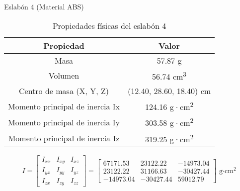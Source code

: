 {Eslabón 4 (Material ABS)}


\begin{table}[H]
	\centering
	\caption{Propiedades físicas del eslabón 4}
	\begin{tabular}{|c|c|}
		\hline
		\textbf{Propiedad} & \textbf{Valor} \\
		\hline
		Masa & 57.87 g \\
		Volumen & 56.74 cm\textsuperscript{3} \\
		Centro de masa (X, Y, Z) & (12.40, 28.60, 18.40) cm \\
		Momento principal de inercia Ix & 124.16 g·cm\textsuperscript{2} \\
		Momento principal de inercia Iy & 303.58 g·cm\textsuperscript{2} \\
		Momento principal de inercia Iz & 319.25 g·cm\textsuperscript{2} \\
		\hline
	\end{tabular}
\end{table}


\begin{equation*}
	I =
	\begin{bmatrix}
		I_{xx} & I_{xy} & I_{xz} \\
		I_{yx} & I_{yy} & I_{yz} \\
		I_{zx} & I_{zy} & I_{zz}
	\end{bmatrix}
	=
	\begin{bmatrix}
		67171.53 & 23122.22 & -14973.04 \\
		23122.22 & 31166.63 & -30427.44 \\
		-14973.04 & -30427.44 & 59012.79
	\end{bmatrix}
	\text{ g·cm}^2
\end{equation*}

